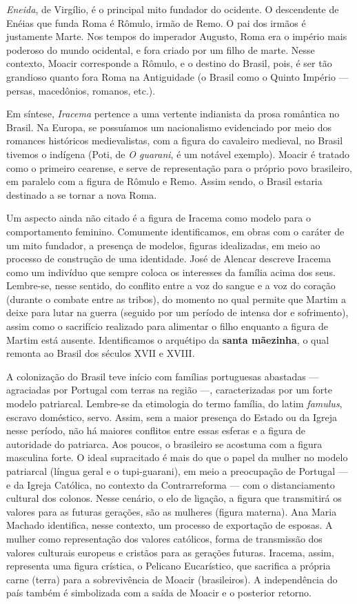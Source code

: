 \documentclass[12pt]{book}
\begin{document}
				\par \textit{Eneida}, de Virgílio, é o principal mito fundador do ocidente. O descendente de Enéias que funda Roma é Rômulo, irmão de Remo. O pai dos irmãos é justamente Marte. Nos tempos do imperador Augusto, Roma era o império mais poderoso do mundo ocidental, e fora criado por um filho de marte. Nesse contexto, Moacir corresponde a Rômulo, e o destino do Brasil, pois, é ser tão grandioso quanto fora Roma na Antiguidade (o Brasil como o Quinto Império — persas, macedônios, romanos, etc.).
				\par Em síntese, \textit{Iracema} pertence a uma vertente indianista da prosa romântica no Brasil. Na Europa, se possuíamos um nacionalismo evidenciado por meio dos romances históricos medievalistas, com a figura do cavaleiro medieval, no Brasil tivemos o indígena (Poti, de \textit{O guarani}, é um notável exemplo). Moacir é tratado como o primeiro cearense, e serve de representação para o próprio povo brasileiro, em paralelo com a figura de Rômulo e Remo. Assim sendo, o Brasil estaria destinado a se tornar a nova Roma.
				\par Um aspecto ainda não citado é a figura de Iracema como modelo para o comportamento feminino. Comumente identificamos, em obras com o caráter de um mito fundador, a presença de modelos, figuras idealizadas, em meio ao processo de construção de uma identidade. José de Alencar descreve Iracema como um indivíduo que sempre coloca os interesses da família acima dos seus. Lembre-se, nesse sentido, do conflito entre a voz do sangue e a voz do coração (durante o combate entre as tribos), do momento no qual permite que Martim a deixe para lutar na guerra (seguido por um período de intensa dor e sofrimento), assim como o sacrifício realizado para alimentar o filho enquanto a figura de Martim está ausente. Identificamos o arquétipo da \textbf{santa mãezinha}, o qual remonta ao Brasil dos séculos XVII e XVIII.
				\par A colonização do Brasil teve início com famílias portuguesas abastadas — agraciadas por Portugal com terras na região —, caracterizadas por um forte modelo patriarcal. Lembre-se da etimologia do termo família, do latim \textit{famulus}, escravo doméstico, servo. Assim, sem a maior presença do Estado ou da Igreja nesse período, não há maiores conflitos entre essas esferas e a figura de autoridade do patriarca. Aos poucos, o brasileiro se acostuma com a figura masculina forte. O ideal supracitado é mais do que o papel da mulher no modelo patriarcal (língua geral e o tupi-guarani), em meio a preocupação de Portugal — e da Igreja Católica, no contexto da Contrarreforma — com o distanciamento cultural dos colonos. Nesse cenário, o elo de ligação, a figura que transmitirá os valores para as futuras gerações, são as mulheres (figura materna). Ana Maria Machado identifica, nesse contexto, um processo de exportação de esposas. A mulher como representação dos valores católicos, forma de transmissão dos valores culturais europeus e cristãos para as gerações futuras. Iracema, assim, representa uma figura crística, o Pelicano Eucarístico, que sacrifica a própria carne (terra) para a sobrevivência de Moacir (brasileiros). A independência do país também é simbolizada com a saída de Moacir e o posterior retorno.
\end{document}
